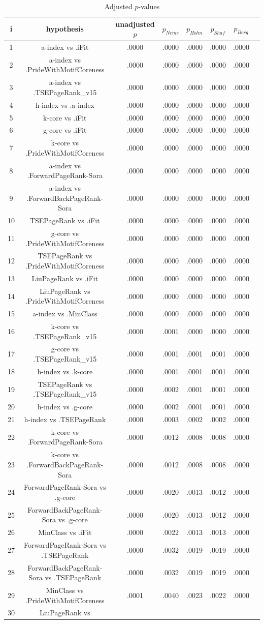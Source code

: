 \documentclass[a4paper,10pt]{article}
\begin{document}
\begin{landscape}
\begin{table}[!htp]
\centering\tiny
\caption{Adjusted $p$-values}
\begin{tabular}{cccccccc}
i&hypothesis&unadjusted $p$&$p_{Neme}$&$p_{Holm}$&$p_{Shaf}$&$p_{Berg}$\\
\hline
1&a-index vs .iFit&.0000&.0000&.0000&.0000&.0000\\2&a-index vs .PrideWithMotifCoreness&.0000&.0000&.0000&.0000&.0000\\3&a-index vs .TSEPageRank_v15&.0000&.0000&.0000&.0000&.0000\\4&h-index vs .a-index&.0000&.0000&.0000&.0000&.0000\\5&k-core vs .iFit&.0000&.0000&.0000&.0000&.0000\\6&g-core vs .iFit&.0000&.0000&.0000&.0000&.0000\\7&k-core vs .PrideWithMotifCoreness&.0000&.0000&.0000&.0000&.0000\\8&a-index vs .ForwardPageRank-Sora&.0000&.0000&.0000&.0000&.0000\\9&a-index vs .ForwardBackPageRank-Sora&.0000&.0000&.0000&.0000&.0000\\10&TSEPageRank vs .iFit&.0000&.0000&.0000&.0000&.0000\\11&g-core vs .PrideWithMotifCoreness&.0000&.0000&.0000&.0000&.0000\\12&TSEPageRank vs .PrideWithMotifCoreness&.0000&.0000&.0000&.0000&.0000\\13&LiuPageRank vs .iFit&.0000&.0000&.0000&.0000&.0000\\14&LiuPageRank vs .PrideWithMotifCoreness&.0000&.0000&.0000&.0000&.0000\\15&a-index vs .MinClass&.0000&.0000&.0000&.0000&.0000\\16&k-core vs .TSEPageRank_v15&.0000&.0001&.0000&.0000&.0000\\17&g-core vs .TSEPageRank_v15&.0000&.0001&.0001&.0001&.0000\\18&h-index vs .k-core&.0000&.0001&.0001&.0001&.0000\\19&TSEPageRank vs .TSEPageRank_v15&.0000&.0002&.0001&.0001&.0000\\20&h-index vs .g-core&.0000&.0002&.0001&.0001&.0000\\21&h-index vs .TSEPageRank&.0000&.0003&.0002&.0002&.0000\\22&k-core vs .ForwardPageRank-Sora&.0000&.0012&.0008&.0008&.0000\\23&k-core vs .ForwardBackPageRank-Sora&.0000&.0012&.0008&.0008&.0000\\24&ForwardPageRank-Sora vs .g-core&.0000&.0020&.0013&.0012&.0000\\25&ForwardBackPageRank-Sora vs .g-core&.0000&.0020&.0013&.0012&.0000\\26&MinClass vs .iFit&.0000&.0022&.0013&.0013&.0000\\27&ForwardPageRank-Sora vs .TSEPageRank&.0000&.0032&.0019&.0019&.0000\\28&ForwardBackPageRank-Sora vs .TSEPageRank&.0000&.0032&.0019&.0019&.0000\\29&MinClass vs .PrideWithMotifCoreness&.0001&.0040&.0023&.0022&.0000\\30&LiuPageRank vs 
\end{tabular}
\end{table}
\end{landscape}
\end{document}

